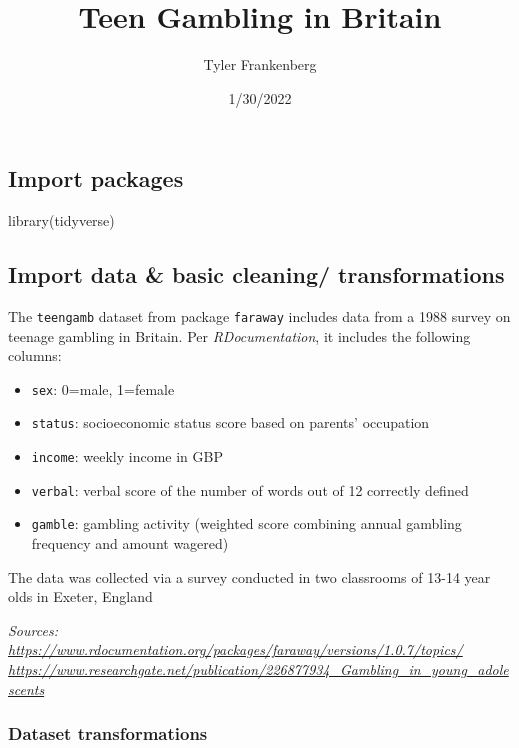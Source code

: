 \documentclass[
]{article}
\title{Teen Gambling in Britain}
\author{Tyler Frankenberg}
\date{1/30/2022}
\newenvironment{Shaded}{\begin{snugshade}}{\end{snugshade}}
\newcommand{\FunctionTok}[1]{\textcolor[rgb]{0.00,0.00,0.00}{#1}}
\newcommand{\NormalTok}[1]{#1}
\providecommand{\tightlist}{%
  \setlength{\itemsep}{0pt}\setlength{\parskip}{0pt}}
\begin{document}
\maketitle

\hypertarget{import-packages}{%
\subsection{Import packages}\label{import-packages}}

\begin{Shaded}
\begin{Highlighting}[]
\FunctionTok{library}\NormalTok{(tidyverse)}
\end{Highlighting}
\end{Shaded}

\hypertarget{import-data-basic-cleaning-transformations}{%
\subsection{Import data \& basic cleaning/
transformations}\label{import-data-basic-cleaning-transformations}}

The \texttt{teengamb} dataset from package \texttt{faraway} includes
data from a 1988 survey on teenage gambling in Britain. Per
\emph{RDocumentation}, it includes the following columns:

\begin{itemize}
\tightlist
\item
  \texttt{sex}: 0=male, 1=female
\item
  \texttt{status}: socioeconomic status score based on parents'
  occupation\\
\item
  \texttt{income}: weekly income in GBP
\item
  \texttt{verbal}: verbal score of the number of words out of 12
  correctly defined
\item
  \texttt{gamble}: gambling activity (weighted score combining annual
  gambling frequency and amount wagered)
\end{itemize}

The data was collected via a survey conducted in two classrooms of 13-14
year olds in Exeter, England

\emph{Sources:
\url{https://www.rdocumentation.org/packages/faraway/versions/1.0.7/topics/}\\
\url{https://www.researchgate.net/publication/226877934_Gambling_in_young_adolescents}}

\hypertarget{dataset-transformations}{%
\subsubsection{Dataset transformations}\label{dataset-transformations}}
\end{document}
